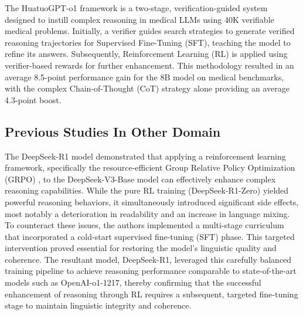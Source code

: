 \documentclass[conference]{IEEEtran}
\begin{document}
The HuatuoGPT-o1 \cite{b13} framework is a two-stage, verification-guided system designed to instill complex reasoning in medical LLMs using 40K verifiable medical problems. Initially, a verifier guides search strategies to generate verified reasoning trajectories for Supervised Fine-Tuning (SFT), teaching the model to refine its answers. Subsequently, Reinforcement Learning (RL) is applied using verifier-based rewards for further enhancement. This methodology resulted in an average 8.5-point performance gain for the 8B model on medical benchmarks, with the complex Chain-of-Thought (CoT) strategy alone providing an average 4.3-point boost.



         \subsection{Previous Studies In Other Domain}

The DeepSeek-R1 model \cite{b14} demonstrated that applying a reinforcement learning framework, specifically the resource-efficient Group Relative Policy Optimization (GRPO) \cite{b15} , to the DeepSeek-V3-Base model can effectively enhance complex reasoning capabilities. While the pure RL training (DeepSeek-R1-Zero) yielded powerful reasoning behaviors, it simultaneously introduced significant side effects, most notably a deterioration in readability and an increase in language mixing. To counteract these issues, the authors implemented a multi-stage curriculum that incorporated a cold-start supervised fine-tuning (SFT) phase. This targeted intervention proved essential for restoring the model's linguistic quality and coherence. The resultant model, DeepSeek-R1, leveraged this carefully balanced training pipeline to achieve reasoning performance comparable to state-of-the-art models such as OpenAI-o1-1217, thereby confirming that the successful enhancement of reasoning through RL requires a subsequent, targeted fine-tuning stage to maintain linguistic integrity and coherence.
\end{document}
